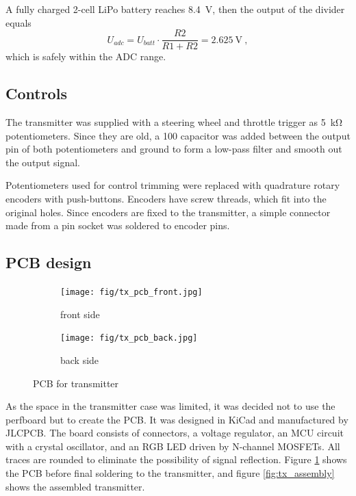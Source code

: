 A fully charged 2-cell LiPo battery reaches \SI{8.4}{\V}, then the output of the divider equals
\begin{equation}
	U_{adc} = U_{batt} \cdot \frac{R2}{R1+R2} = \SI{2.625}{\V}\ ,
\end{equation}
which is safely within the ADC range.

\subsection{Controls}
The transmitter was supplied with a steering wheel and throttle trigger as \SI{5}{\kohm} potentiometers. Since they are old, a \SI{100}{\nF} capacitor was added between the output pin of both potentiometers and ground to form a low-pass filter and smooth out the output signal.

Potentiometers used for control trimming were replaced with quadrature rotary encoders with push-buttons. Encoders have screw threads, which fit into the original holes. Since encoders are fixed to the transmitter, a simple connector made from a pin socket was soldered to encoder pins.

\subsection{PCB design}
    \begin{figure}[b]
    \centering
    \begin{subfigure}{0.495\textwidth}
    \centering
        \texttt{[image: fig/tx\_pcb\_front.jpg]}
		\caption{front side}
    \end{subfigure}%
    \hfill
    \begin{subfigure}{0.495\textwidth}
    \centering
		\texttt{[image: fig/tx\_pcb\_back.jpg]}
		\caption{back side}
    \end{subfigure}
	\caption{PCB for transmitter}
    \label{fig:tx_pcb}
    \end{figure}

As the space in the transmitter case was limited, it was decided not to use the perfboard but to create the PCB. It was designed in KiCad and manufactured by JLCPCB. The board consists of connectors, a voltage regulator, an MCU circuit with a crystal oscillator, and an RGB LED driven by N-channel MOSFETs. All traces are rounded to eliminate the possibility of signal reflection. Figure \ref{fig:tx_pcb} shows the PCB before final soldering to the transmitter, and figure \ref{fig:tx_assembly} shows the assembled transmitter.

